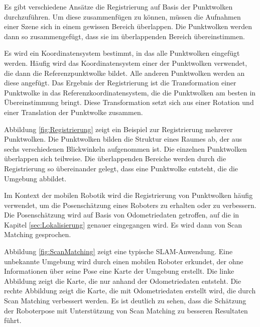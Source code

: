 Es gibt verschiedene Ansätze die Registrierung auf Basis der Punktwolken durch\-zu\-füh\-ren. Um diese zusammenfügen zu können, müssen die Aufnahmen einer Szene sich in einem gewissen Bereich überlappen. Die Punktwolken werden dann so zusammengefügt, dass sie im überlappenden Bereich übereinstimmen. 

Es wird ein Koordinatensystem bestimmt, in das alle Punktwolken eingefügt werden. Häufig wird das Koordinatensystem einer der Punktwolken verwendet, die dann die Referenzpunktwolke bildet. Alle anderen Punktwolken werden an diese angefügt. Das Ergebnis der Registrierung ist die Transformation einer Punktwolke in das Re\-fe\-renz\-ko\-or\-di\-na\-ten\-sys\-tem, die die Punktwolken am besten in Übereinstimmung bringt. Diese Transformation setzt sich aus einer Rotation und einer Translation der Punktwolke zusammen. 

Abbildung \ref{fig:Registrierung} zeigt ein Beispiel zur Registrierung mehrerer Punkt\-wol\-ken. Die Punkt\-wol\-ken bilden die Struktur eines Raumes ab, der aus sechs verschiedenen Blickwinkeln aufgenommen ist. Die einzelnen Punktwolken überlappen sich teilweise. Die überlappenden Bereiche werden durch die Registrierung so übereinander gelegt, dass eine  Punktwolke entsteht, die die Umgebung abbildet. 


Im Kontext der mobilen Robotik wird die Registrierung von Punktwolken häufig verwendet, um die Posenschätzung eines Roboters zu erhalten oder zu verbessern. Die Posenschätzung wird auf Basis von Odometriedaten 
getroffen, auf die in Kapitel \ref{sec:Lokalisierung} genauer eingegangen wird. Es wird dann von Scan Matching gesprochen. 

Abbildung \ref{fig:ScanMatching} zeigt eine typische SLAM-Anwendung. Eine unbekannte Umgebung wird durch einen mobilen Roboter erkundet, der ohne Informationen über seine Pose eine Karte der Umgebung erstellt. Die linke Abbildung zeigt die Karte, die nur anhand der Odometriedaten entsteht. Die rechte Abbildung zeigt die Karte, die mit Odometriedaten erstellt wird, die durch Scan Matching verbessert werden. Es ist deutlich zu sehen, dass die Schätzung der Roboterpose mit Unterstützung von Scan Matching zu besseren Resultaten führt. 


